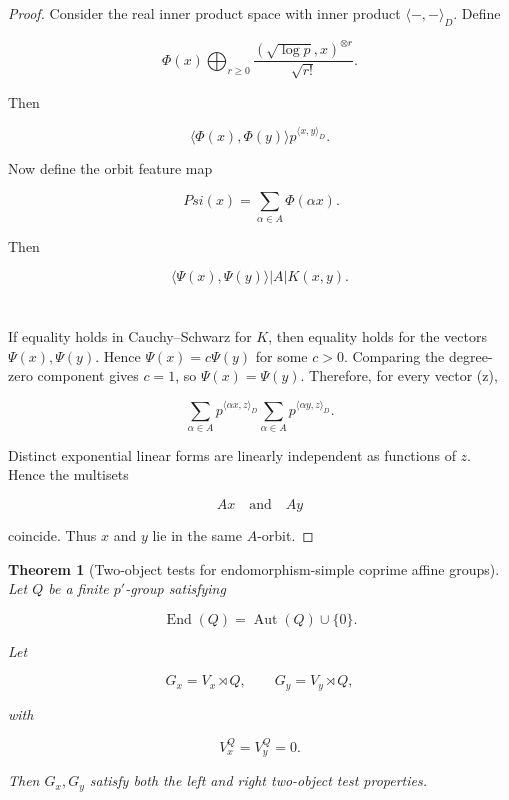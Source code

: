 \documentclass[11pt]{article}
\newtheorem{theorem}{Theorem}[section]
\begin{document}
\begin{proof}
Consider the real inner product space with inner product $\langle-,-\rangle_D$. Define

\[
\Phi(x)
\bigoplus_{r\ge0}
\frac{(\sqrt{\log p},x)^{\otimes r}}{\sqrt{r!}}.
\]

Then

\[
\langle\Phi(x),\Phi(y)\rangle
p^{\langle x,y\rangle_D}.
\]

Now define the orbit feature map

\[
\
Psi(
x
)=\sum_{\alpha\in A}\Phi(\alpha x).
\]

Then

\[
\langle\Psi(x),\Psi(y)\rangle
|A|K(x,y).
\]

\[
\]

\[
\]

If equality holds in Cauchy--Schwarz for $K$, then equality holds for the vectors $\Psi(x),\Psi(y)$. Hence $\Psi(x)=c\Psi(y)$ for some $c>0$. Comparing the degree-zero component gives $c=1$, so $\Psi(x)=\Psi(y)$. Therefore, for every vector (z),

\[
\sum_{\alpha\in A}
p^{\langle\alpha x,z\rangle_D}
\sum_{\alpha\in A}
p^{\langle\alpha y,z\rangle_D}.
\]

Distinct exponential linear forms are linearly independent as functions of $z$. Hence the multisets

\[
A x
\quad\text{and}\quad
A y
\]

coincide. Thus $x$ and $y$ lie in the same $A$-orbit.

\end{proof}

\begin{theorem}[Two-object tests for endomorphism-simple coprime affine groups]
Let $Q$ be a finite $p'$-group satisfying

\[
\operatorname{End}(Q)=\operatorname{Aut}(Q)\cup\{0\}.
\]

Let

\[
G_x=V_x\rtimes Q,
\qquad
G_y=V_y\rtimes Q,
\]

with

\[
V_x^Q=V_y^Q=0.
\]

Then $G_x,G_y$ satisfy both the left and right two-object test properties.

\end{theorem}
\end{document}
